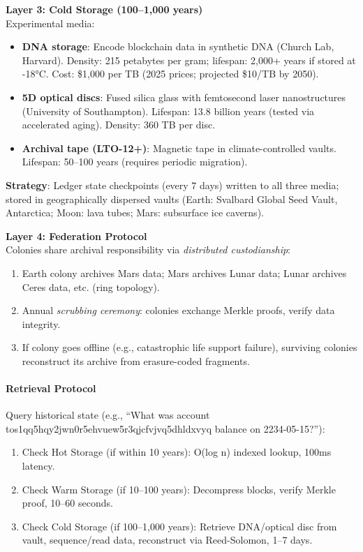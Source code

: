 \documentclass[11pt]{article}
\begin{document}
\textbf{Layer 3: Cold Storage (100--1,000 years)}\\
Experimental media:
\begin{itemize}[noitemsep]
  \item \textbf{DNA storage}: Encode blockchain data in synthetic DNA (Church Lab, Harvard). Density: 215 petabytes per gram; lifespan: 2,000+ years if stored at -18°C. Cost: \$1,000 per TB (2025 prices; projected \$10/TB by 2050).
  \item \textbf{5D optical discs}: Fused silica glass with femtosecond laser nanostructures (University of Southampton). Lifespan: 13.8 billion years (tested via accelerated aging). Density: 360 TB per disc.
  \item \textbf{Archival tape (LTO-12+)}: Magnetic tape in climate-controlled vaults. Lifespan: 50--100 years (requires periodic migration).
\end{itemize}
\textbf{Strategy}: Ledger state checkpoints (every 7 days) written to all three media; stored in geographically dispersed vaults (Earth: Svalbard Global Seed Vault, Antarctica; Moon: lava tubes; Mars: subsurface ice caverns).

\textbf{Layer 4: Federation Protocol}\\
Colonies share archival responsibility via \emph{distributed custodianship}:
\begin{enumerate}[noitemsep]
  \item Earth colony archives Mars data; Mars archives Lunar data; Lunar archives Ceres data, etc. (ring topology).
  \item Annual \emph{scrubbing ceremony}: colonies exchange Merkle proofs, verify data integrity.
  \item If colony goes offline (e.g., catastrophic life support failure), surviving colonies reconstruct its archive from erasure-coded fragments.
\end{enumerate}

\paragraph{Retrieval Protocol}
Query historical state (e.g., ``What was account tos1qq5hqy2jwn0r5ehvuew5r3qjcfvjvq5dhldxvyq balance on 2234-05-15?''):
\begin{enumerate}[noitemsep]
  \item Check Hot Storage (if within 10 years): O(log n) indexed lookup, 100ms latency.
  \item Check Warm Storage (if 10--100 years): Decompress blocks, verify Merkle proof, 10--60 seconds.
  \item Check Cold Storage (if 100--1,000 years): Retrieve DNA/optical disc from vault, sequence/read data, reconstruct via Reed-Solomon, 1--7 days.
\end{enumerate}
\end{document}
